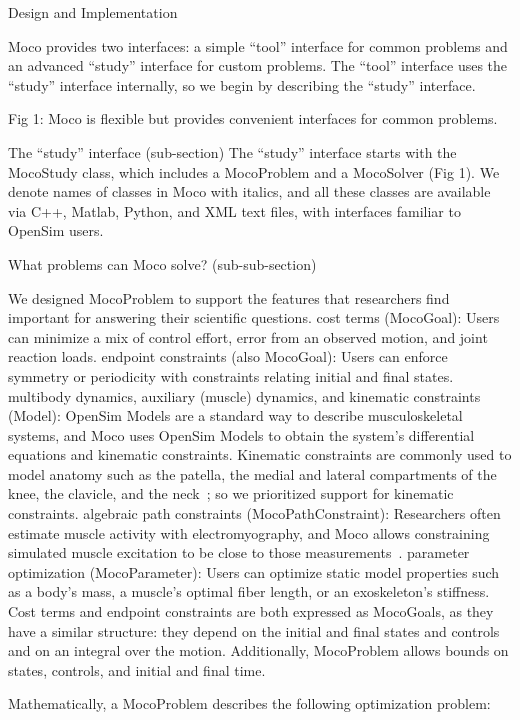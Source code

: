 \documentclass[10pt,letterpaper]{article}
\begin{document}
Design and Implementation

Moco provides two interfaces: a simple “tool” interface for common problems and an advanced “study” interface for custom problems. The “tool” interface uses the “study” interface internally, so we begin by describing the “study” interface.


Fig 1: Moco is flexible but provides convenient interfaces for common problems.

The “study” interface (sub-section)
The “study” interface starts with the MocoStudy class, which includes a MocoProblem and a MocoSolver (Fig 1). We denote names of classes in Moco with italics, and all these classes are available via C++, Matlab, Python, and XML text files, with interfaces familiar to OpenSim users.

What problems can Moco solve? (sub-sub-section)

We designed MocoProblem to support the features that researchers find important for answering their scientific questions.
cost terms (MocoGoal): Users can minimize a mix of control effort, error from an observed motion, and joint reaction loads.
endpoint constraints (also MocoGoal): Users can enforce symmetry or periodicity with constraints relating initial and final states.
multibody dynamics, auxiliary (muscle) dynamics, and kinematic constraints (Model): OpenSim Models are a standard way to describe musculoskeletal systems, and Moco uses OpenSim Models to obtain the system’s differential equations and kinematic constraints. Kinematic constraints are commonly used to model anatomy such as the patella, the medial and lateral compartments of the knee, the clavicle, and the neck~\cite{Seth:2016,Lerner:2015,Rajagopal:2016ek,Cazzola:2017}; so we prioritized support for kinematic constraints.
algebraic path constraints (MocoPathConstraint): Researchers often estimate muscle activity with electromyography, and Moco allows constraining simulated muscle excitation to be close to those measurements~\cite{Pizzolato:2015,Falisse:2016}.
parameter optimization (MocoParameter): Users can optimize static model properties such as a body’s mass, a muscle’s optimal fiber length, or an exoskeleton’s stiffness.
Cost terms and endpoint constraints are both expressed as MocoGoals, as they have a similar structure: they depend on the initial and final states and controls and on an integral over the motion. Additionally, MocoProblem allows bounds on states, controls, and initial and final time.

Mathematically, a MocoProblem describes the following optimization problem:
\end{document}
